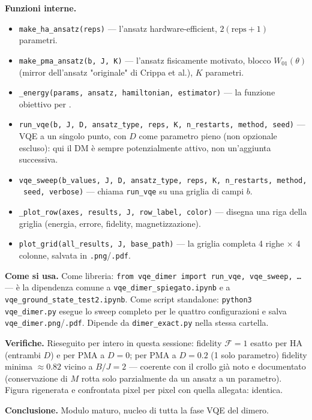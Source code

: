 \documentclass[11pt,a4paper]{article}
\begin{document}
\textbf{Funzioni interne.}
\begin{itemize}
\item \texttt{make\_ha\_ansatz(reps)} — l'ansatz hardware-efficient, $2(\text{reps}{+}1)$
parametri.
\item \texttt{make\_pma\_ansatz(b,\ J,\ K)} — l'ansatz fisicamente motivato, blocco
$W_{01}(\theta)$ (mirror dell'ansatz "originale" di Crippa et al.), $K$ parametri.
\item \texttt{\_energy(params,\ ansatz,\ hamiltonian,\ estimator)} — la funzione
obiettivo per \texttt{}.
\item \texttt{run\_vqe(b,\ J,\ D,\ ansatz\_type,\ reps,\ K,\ n\_restarts,\ method,\
seed)} — VQE a un singolo punto, con $D$ come parametro pieno (non opzionale
escluso): qui il DM è sempre potenzialmente attivo, non un'aggiunta successiva.
\item \texttt{vqe\_sweep(b\_values,\ J,\ D,\ ansatz\_type,\ reps,\ K,\ n\_restarts,\
method,\ seed,\ verbose)} — chiama \texttt{run\_vqe} su una griglia di campi $b$.
\item \texttt{\_plot\_row(axes,\ results,\ J,\ row\_label,\ color)} — disegna una
riga della griglia (energia, errore, fidelity, magnetizzazione).
\item \texttt{plot\_grid(all\_results,\ J,\ base\_path)} — la griglia completa
4 righe $\times$ 4 colonne, salvata in \texttt{.png}/\texttt{.pdf}.
\end{itemize}

\textbf{Come si usa.} Come libreria: \texttt{from vqe\_dimer import run\_vqe,
vqe\_sweep, \ldots} — è la dipendenza comune a \texttt{vqe\_dimer\_spiegato.ipynb} e
a \texttt{vqe\_ground\_state\_test2.ipynb}. Come script standalone: \texttt{python3
vqe\_dimer.py} esegue lo sweep completo per le quattro configurazioni e salva
\texttt{vqe\_dimer.png}/\texttt{.pdf}. Dipende da \texttt{dimer\_exact.py} nella
stessa cartella.

\textbf{Verifiche.} Rieseguito per intero in questa sessione: fidelity $\mathcal
F=1$ esatto per HA (entrambi $D$) e per PMA a $D=0$; per PMA a $D=0.2$ (1 solo
parametro) fidelity minima $\approx0.82$ vicino a $B/J=2$ — coerente con il crollo
già noto e documentato (conservazione di $M$ rotta solo parzialmente da un ansatz a
un parametro). Figura rigenerata e confrontata pixel per pixel con quella allegata:
identica.

\textbf{Conclusione.} Modulo maturo, nucleo di tutta la fase VQE del dimero.
\end{document}
